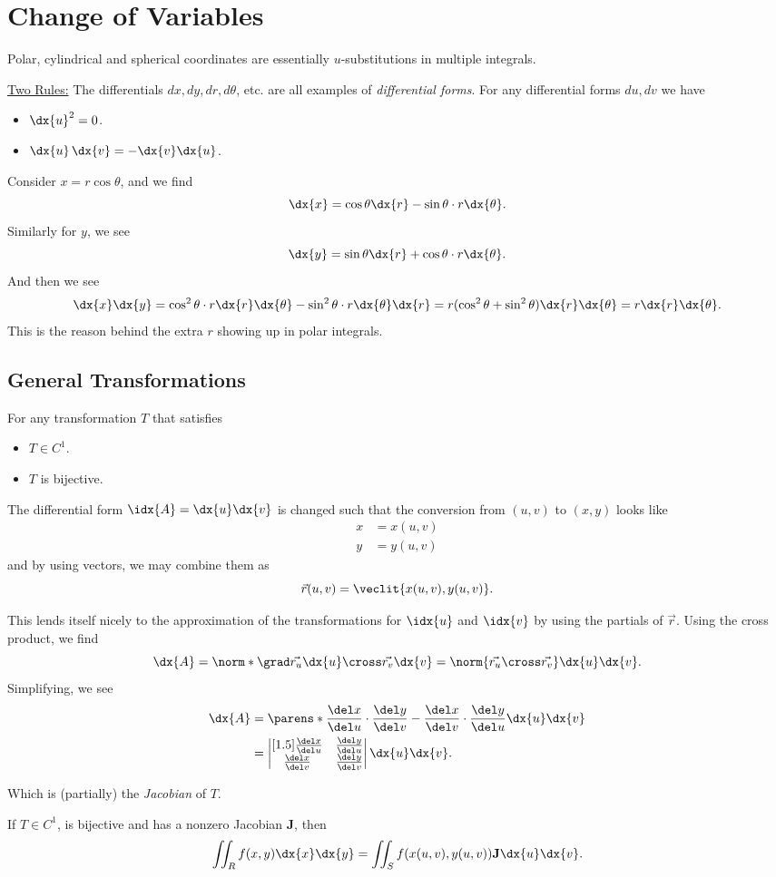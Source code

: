 \documentclass{article}
\begin{document}
\section{Change of Variables}
Polar, cylindrical and spherical coordinates are essentially $u$-substitutions in multiple integrals.

\underline{Two Rules:}
The differentials $dx, dy, dr, d\theta$, etc. are all examples of \emph{differential forms}.
For any differential forms $du, dv$ we have
\begin{itemize}
  \item $\dx{u}^{2} = 0$.
  \item $\dx{u}\, \dx{v} = - \dx{v}\dx{u}$.
\end{itemize}

\begin{ex}
  Consider $x = r\cos\theta$, and we find
  \[ \dx{x} = \cos\theta \dx{r} - \sin\theta \cdot  r\dx{\theta}. \]
  Similarly for $y$, we see
  \[ \dx{y} = \sin\theta \dx{r} + \cos\theta \cdot r\dx{\theta}. \]
  And then we see
  \[ \dx{x}\dx{y} = \cos^{2}\theta \cdot r\dx{r}\dx{\theta} - \sin^{2}\theta\cdot r\dx{\theta}\dx{r} = r(\cos^{2}\theta + \sin^{2}\theta)\dx{r}\dx{\theta} = r\dx{r}\dx{\theta}.  \]
  This is the reason behind the extra $r$ showing up in polar integrals.
\end{ex}

\subsection{General Transformations}
For any transformation $T$ that satisfies
\begin{itemize}
  \item $T \in C^{1}$.
  \item $T$ is bijective.
\end{itemize}
The differential form $\idx{A} = \dx{u}\dx{v}$ is changed such that the conversion from $(u, v)$ to $(x, y)$ looks like
\begin{align*}
  x &= x(u, v)\\
  y &= y(u, v)
\end{align*}
and by using vectors, we may combine them as
\[ \vec{r}(u, v) = \veclit{x(u, v), y(u, v)}. \]

This lends itself nicely to the approximation of the transformations for $\idx{u}$ and $\idx{v}$ by using the partials of $\vec{r}$.
Using the cross product, we find
\[ \dx{A} = \norm*{\grad \vec{r_{u}}\dx{u} \cross \vec{r_{v}}\dx{v}} = \norm{\vec{r_{u}} \cross \vec{r_{v}}}\dx{u}\dx{v}. \]
Simplifying, we see
\begin{align*}
  \dx{A} &= \parens*{\frac{\del x}{\del u} \cdot \frac{\del y}{\del v} - \frac{\del x}{\del v}\cdot\frac{\del y}{\del u}}\dx{u}\dx{v}\\
  &= \begin{vmatrix}[1.5]
    \frac{\del x}{\del u} & \frac{\del y}{\del u}\\
    \frac{\del x}{\del v} & \frac{\del y}{\del v}
  \end{vmatrix} \dx{u}\dx{v}.
\end{align*}

Which is (partially) the \emph{Jacobian} of $T$.

\begin{theorem}
  If $T \in C^{1}$, is bijective and has a nonzero Jacobian $\mathbf{J}$, then
  \[
    \iint_{R} f(x, y) \dx{x}\dx{y} = \iint_{S} f(x(u, v), y(u, v))\mathbf{J}\dx{u}\dx{v}.
  \]
\end{theorem}
\end{document}
